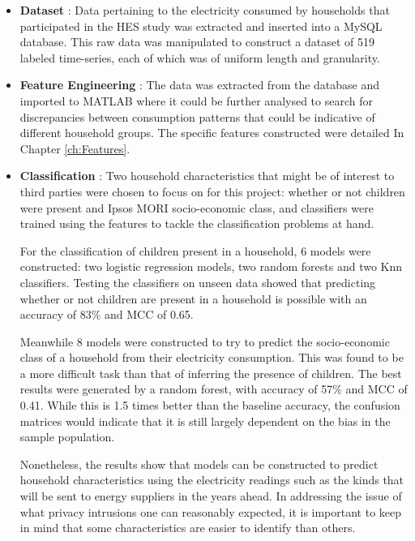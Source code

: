 \begin{itemize}

\item \textbf{Dataset} : Data pertaining to the electricity consumed by households that participated in the HES study was extracted and inserted into a MySQL database. This raw data was manipulated to construct a dataset of 519 labeled time-series, each of which was of uniform length and granularity.

\item \textbf{Feature Engineering} : The data was extracted from the database and imported to MATLAB where it could be further analysed to search for discrepancies between consumption patterns that could be indicative of different household groups. The specific features constructed were detailed In Chapter \ref{ch:Features}.

\item \textbf{Classification} : Two household characteristics that might be of interest to third parties were chosen to focus on for this project:  whether or not children were present and Ipsos MORI socio-economic class, and classifiers were trained using the features to tackle the classification problems at hand. 

For the classification of children present in a household, 6 models were constructed: two logistic regression models, two random forests and two Knn classifiers. Testing the classifiers on unseen data showed that predicting whether or not children are present in a household is possible with an accuracy of 83\% and MCC of 0.65. 

Meanwhile 8 models were constructed to try to predict the socio-economic class of a household from their electricity consumption. This was found to be a more difficult task than that of inferring the presence of children. The best results were generated by a random forest, with accuracy of 57\% and MCC of 0.41. While this is 1.5 times better than the baseline accuracy, the confusion matrices would indicate that it is still largely dependent on the bias in the sample population. 

Nonetheless, the results show that models can be constructed to predict household characteristics using the electricity readings such as the kinds that will be sent to energy suppliers in the years ahead. In addressing the issue of what privacy intrusions one can reasonably expected, it is important to keep in mind that some characteristics are easier to identify than others.
\end{itemize}

